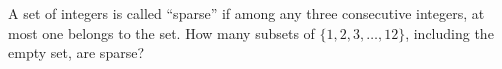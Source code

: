 A set of integers is called ``sparse'' if among any three consecutive integers, at most one belongs to the set. How many subsets of $\{1, 2, 3, \ldots, 12\}$, including the empty set, are sparse?
